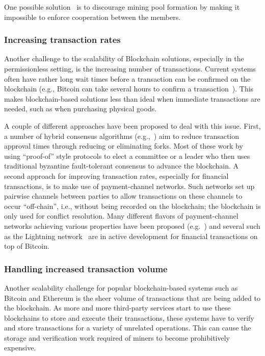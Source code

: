 One possible solution~\cite{CCS:MKKS15} is to discourage mining pool formation by making it impossible to enforce cooperation between the members.

\subsubsection{Increasing transaction rates}
Another challenge to the scalability of Blockchain solutions, especially in the permissionless setting, is the increasing number of transactions.
Current systems often have rather long wait times before a transaction can be confirmed on the blockchain (e.g., Bitcoin can take several hours to confirm a transaction~\cite{BlockchainInfoTransactionConfTime}).  This makes blockchain-based solutions less than ideal when immediate transactions are needed, such as when purchasing physical goods.

A couple of different approaches have been proposed to deal with this issue.  First, a number of hybrid consensus algorithms (e.g.,~\cite{SOSP:GHMVZ17,OPODIS:AMNRS17,DISC:PasShi17,EC:PasShi18,NSDI:EGSR16}) aim to reduce transaction approval times through reducing or eliminating forks. Most of these work by using ``proof-of'' style protocols to elect a committee or a leader who then uses traditional byzantine fault-tolerant consensus to advance the blockchain.  A second approach for improving transaction rates, especially for financial transactions, is to make use of payment-channel networks. Such networks set up pairwise channels between parties to allow transactions on these channels to occur ``off-chain'', i.e., without being recorded on the blockchain; the blockchain is only used for conflict resolution.  Many different flavors of payment-channel networks achieving various properties have been proposed (e.g.~\cite{PooDry16, NDSS:HABSG17,CCS:KhaGer17,SYSTOR:LNEKPS18,CCS:MMKMR17,CCS:GreMie17}) and several such as the Lightning network~\cite{PooDry16} are in active development for financial transactions on top of Bitcoin.  

\subsubsection{Handling increased transaction volume}
Another scalability challenge for popular blockchain-based systems such as Bitcoin and Ethereum is the sheer volume of transactions that are being added to the blockchain.  As more and more third-party services start to use these blockchains to store and execute their transactions, these systems have to verify and store transactions for a variety of unrelated operations. This can cause the storage and verification work required of miners to become prohibitively expensive.

